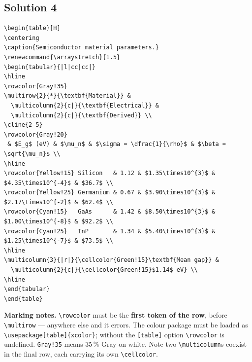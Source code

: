 \documentclass[11pt]{article}
\begin{document}
\subsection*{Solution 4}
\begin{lstlisting}[style=tex]
\begin{table}[H]
\centering
\caption{Semiconductor material parameters.}
\renewcommand{\arraystretch}{1.5}
\begin{tabular}{|l|cc|cc|}
\hline
\rowcolor{Gray!35}
\multirow{2}{*}{\textbf{Material}} &
  \multicolumn{2}{c|}{\textbf{Electrical}} &
  \multicolumn{2}{c|}{\textbf{Derived}} \\
\cline{2-5}
\rowcolor{Gray!20}
 & $E_g$ (eV) & $\mu_n$ & $\sigma = \dfrac{1}{\rho}$ & $\beta = \sqrt{\mu_n}$ \\
\hline
\rowcolor{Yellow!15} Silicon   & 1.12 & $1.35\times10^{3}$ & $4.35\times10^{-4}$ & $36.7$ \\
\rowcolor{Yellow!25} Germanium & 0.67 & $3.90\times10^{3}$ & $2.17\times10^{-2}$ & $62.4$ \\
\rowcolor{Cyan!15}   GaAs      & 1.42 & $8.50\times10^{3}$ & $1.00\times10^{-8}$ & $92.2$ \\
\rowcolor{Cyan!25}   InP       & 1.34 & $5.40\times10^{3}$ & $1.25\times10^{-7}$ & $73.5$ \\
\hline
\multicolumn{3}{|r|}{\cellcolor{Green!15}\textbf{Mean gap}} &
  \multicolumn{2}{c|}{\cellcolor{Green!15}$1.14$ eV} \\
\hline
\end{tabular}
\end{table}
\end{lstlisting}
\textbf{Marking notes.} \verb|\rowcolor| must be the \textbf{first token of the
row}, before \verb|\multirow| --- anywhere else and it errors. The colour
package must be loaded as \verb|\usepackage[table]{xcolor}|; without the
\texttt{[table]} option \verb|\rowcolor| is undefined. \verb|Gray!35| means
35\,\% Gray on white. Note two \verb|\multicolumn|s coexist in the final row,
each carrying its own \verb|\cellcolor|.

\end{document}
